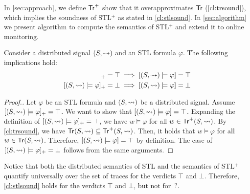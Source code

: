 In \cref{sec:approach}, we define $\mathsf{Tr}^+$ show that it overapproximates $\mathsf{Tr}$ (\cref{cl:trsound}), which implies the soundness of STL$^+$ as stated in \cref{cl:stlsound}.
In \cref{sec:algorithm} we present algorithm to compute the semantics of STL$^+$ and extend it to online monitoring.

\begin{theorem} \label{cl:stlsound}
	Consider a distributed signal $(S,{\rightsquigarrow})$ and an STL formula $\varphi$.
	The following implications hold:
	\begin{align*}
		[(S,{\hb}) \models \varphi]_+ = \top &\implies [(S,{\hb}) \models \varphi] = \top \\
		[(S,{\hb}) \models \varphi]_+ = \bot &\implies [(S,{\hb}) \models \varphi] = \bot \\
	\end{align*}
\end{theorem}
\begin{proof}[\normalsize Proof.]
	\normalsize
	Let $\varphi$ be an STL formula and $(S,{\rightsquigarrow})$ be a distributed signal.
	Assume $[(S,{\rightsquigarrow}) \models \varphi]_+ = \top$.
	We want to show that $[(S,{\rightsquigarrow}) \models \varphi] = \top$.
	Expanding the definition of $[(S,{\rightsquigarrow}) \models \varphi]_+ = \top$, we have $w \models \varphi$ for all $w \in \mathsf{Tr}^+(S,{\rightsquigarrow})$.
	By \cref{cl:trsound}, we have $\mathsf{Tr}(S,{\rightsquigarrow}) \subseteq \mathsf{Tr}^+(S,{\rightsquigarrow})$.
	Then, it holds that $w \models \varphi$ for all $w \in \mathsf{Tr}(S,{\rightsquigarrow})$.
	Therefore, $[(S,{\rightsquigarrow}) \models \varphi] = \top$ by definition.
	The case of $[(S,{\rightsquigarrow}) \models \varphi]_+ = \bot$ follows from the same arguments.
\end{proof}


Notice that both the distributed semantics of STL and the semantics of STL$^+$ quantify universally over the set of traces for the verdicts $\top$ and $\bot$.
Therefore, \cref{cl:stlsound} holds for the verdicts $\top$ and $\bot$, but not for ${\,?}$.

